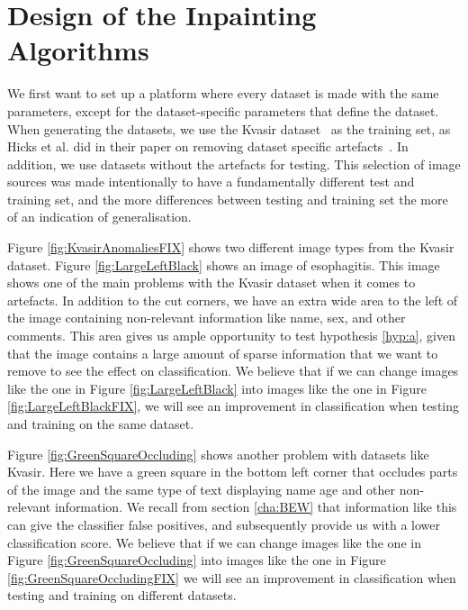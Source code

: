 \section{Design of the Inpainting Algorithms}

We first want to set up a platform where every dataset is made with the same parameters, except for the dataset-specific parameters that define the dataset. 
When generating the datasets, we use the Kvasir dataset~\cite{Pogorelov:2017:KMI:3083187.3083212} as the training set, as Hicks et al. did in their paper on removing dataset specific artefacts~\cite{25956}. In addition, we use datasets without the artefacts for testing.
This selection of image sources was made intentionally to have a fundamentally different test and training set, and the more differences between testing and training set the more of an indication of generalisation. 

Figure \ref{fig:KvasirAnomaliesFIX} shows two different image types from the Kvasir dataset. 
Figure \ref{fig:LargeLeftBlack} shows an image of esophagitis. This image shows one of the main problems with the Kvasir dataset when it comes to artefacts. In addition to the cut corners, we have an extra wide area to the left of the image containing non-relevant information like name, sex, and other comments. This area gives us ample opportunity to test hypothesis \ref{hyp:a}, given that the image contains a large amount of sparse information that we want to remove to see the effect on classification. 
We believe that if we can change images like the one in Figure \ref{fig:LargeLeftBlack} into images like the one in Figure \ref{fig:LargeLeftBlackFIX}, we will see an improvement in classification when testing and training on the same dataset.

Figure \ref{fig:GreenSquareOccluding} shows another problem with datasets like Kvasir.  Here we have a green square in the bottom left corner that occludes parts of the image and the same type of text displaying name age and other non-relevant information. We recall from section \ref{cha:BEW} that information like this can give the classifier false positives, and subsequently provide us with a lower classification score. 
We believe that if we can change images like the one in Figure \ref{fig:GreenSquareOccluding} into images like the one in Figure \ref{fig:GreenSquareOccludingFIX} we will see an improvement in classification when testing and training on different datasets.



